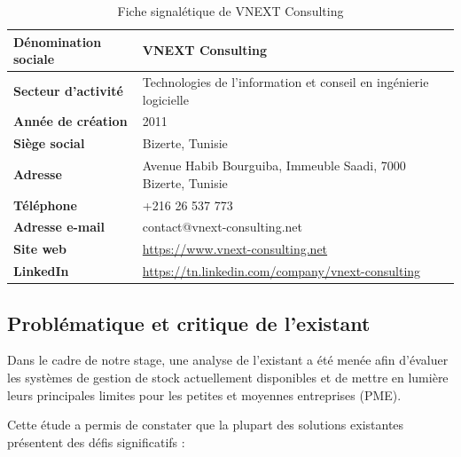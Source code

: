 \begin{table}[H]
\centering
\caption{Fiche signalétique de VNEXT Consulting}
\renewcommand{\arraystretch}{1.4}
\begin{tabular}{|p{5cm}|p{10cm}|}
\hline
\textbf{Dénomination sociale} & VNEXT Consulting \\ \hline
\textbf{Secteur d'activité} & Technologies de l'information et conseil en ingénierie logicielle \\ \hline
\textbf{Année de création} & 2011 \\ \hline
\textbf{Siège social} & Bizerte, Tunisie \\ \hline
\textbf{Adresse} & Avenue Habib Bourguiba, Immeuble Saadi, 7000 Bizerte, Tunisie \\ \hline
\textbf{Téléphone} & +216 26 537 773 \\ \hline
\textbf{Adresse e-mail} & contact@vnext-consulting.net \\ \hline
\textbf{Site web} & \url{https://www.vnext-consulting.net} \\ \hline
\textbf{LinkedIn} & \url{https://tn.linkedin.com/company/vnext-consulting} \\ \hline
\end{tabular}
\end{table}

\subsection{Problématique et critique de l'existant}

Dans le cadre de notre stage, une analyse de l'existant a été menée afin d'évaluer les systèmes de gestion de stock actuellement disponibles et de mettre en lumière leurs principales limites pour les petites et moyennes entreprises (PME).

Cette étude a permis de constater que la plupart des solutions existantes présentent des défis significatifs :

